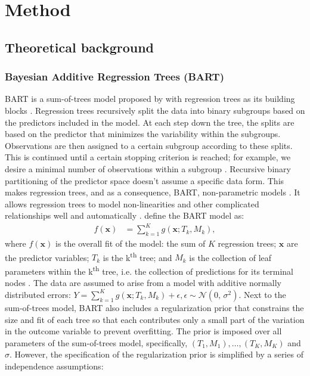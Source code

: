 \documentclass[3p,12pt,a4paper]{elsarticle}
\begin{document}
\section{Method}
\subsection{Theoretical background}
\subsubsection{Bayesian Additive Regression Trees (BART)} \label{sec:bart}
BART is a sum-of-trees model proposed by \citet{chipman2010} with regression trees as its building blocks \citep{chipman2010, hill2020, james2021}. Regression trees recursively split the data into binary subgroups based on the predictors included in the model. At each step down the tree, the splits are based on the predictor that minimizes the variability within the subgroups. Observations are then assigned to a certain subgroup according to these splits. This is continued until a certain stopping criterion is reached; for example, we desire a minimal number of observations within a subgroup \citep{hastie2017, james2021, salditt2023, breiman1984}. Recursive binary partitioning of the predictor space doesn't assume a specific data form. This makes regression trees, and as a consequence, BART, non-parametric models \citep{hastie2017, james2021, salditt2023, breiman1984}. It allows regression trees to model non-linearities and other complicated relationships well and automatically \citep{hill2020, burgette2010}.
\citet{chipman2010} define the BART model as:
\begin{align}
\label{eq:BART}
f(\textbf{x}) &= \sum^{K}_{k=1}g(\textbf{x}; T_{k}, M_{k}),
\end{align} where $f(\mathbf{x})$ is the overall fit of the model: the sum of $K$ regression trees; $\textbf{x}$ are the predictor variables; $T_{k}$ is the k\textsuperscript{th} tree; and $M_{k}$ is the collection of leaf parameters within the k\textsuperscript{th} tree, i.e. the collection of predictions for its terminal nodes \citep{chipman1998, chipman2006, chipman2010, hill2020, james2021}. The data are assumed to arise from a model with additive normally distributed errors: $Y = \sum^{K}_{k=1}g(\textbf{x}; T_{k}, M_{k}) + \epsilon, \epsilon \sim \mathcal{N}(0,\,\sigma^{2})$.
Next to the sum-of-trees model, BART also includes a regularization prior that constrains the size and fit of each tree so that each contributes only a small part of the variation in the outcome variable to prevent overfitting. The prior is imposed over all parameters of the sum-of-trees model, specifically, $(T_1, M_1), \dots, (T_K, M_K)$ and $\sigma$. However, the specification of the regularization prior is simplified by a series of independence assumptions: 
\end{document}
